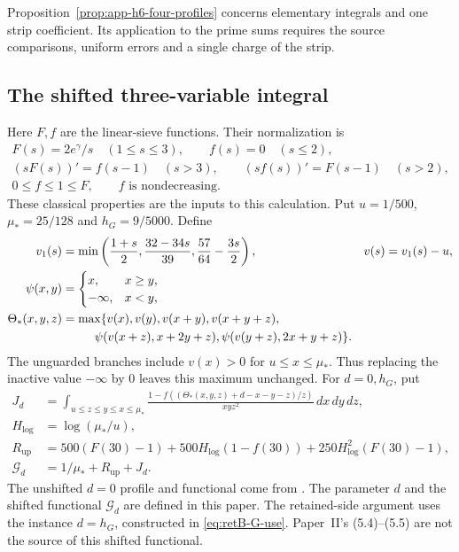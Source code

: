 Proposition~\ref{prop:app-h6-four-profiles} concerns elementary integrals and
one strip coefficient. Its application to the prime sums requires the
source comparisons, uniform errors and a single charge of the strip.


\subsection{The shifted three-variable integral}\label{subsec:app-m5}

Here \(F,f\) are the linear-sieve functions.
Their normalization is
\begin{equation}\label{eq:app-delay-functions}
\begin{gathered}
 F(s)=2e^\gamma/s\quad(1\le s\le3),\qquad f(s)=0\quad(s\le2),\\
 (sF(s))'=f(s-1)\quad(s>3),\qquad(sf(s))'=F(s-1)\quad(s>2),\\
 0\le f\le1\le F,\qquad f\text{ is nondecreasing}.
\end{gathered}
\end{equation}
These classical properties are the inputs to this calculation.
Put \(u=1/500\), \(\mu_*=25/128\) and \(h_G=9/5000\).
Define
\begin{equation}\label{eq:app-six-branch}
\begin{aligned}
 v_1(s)&=\min\left(\frac{1+s}{2},\frac{32-34s}{39},
                         \frac{57}{64}-\frac{3s}{2}\right),&
 v(s)&=v_1(s)-u,\\
 \psi(x,y)&=\begin{cases}x,&x\ge y,\\-\infty,&x<y,\end{cases}\\
 \Theta_*(x,y,z)&=\max\{v(x),v(y),v(x+y),v(x+y+z),\\
 &\hspace{2.7em}\psi(v(x+z),x+2y+z),
               \psi(v(y+z),2x+y+z)\}.
\end{aligned}
\end{equation}
The unguarded branches include \(v(x)>0\) for \(u\le x\le\mu_*\).
Thus replacing the inactive value \(-\infty\) by \(0\)
leaves this maximum unchanged.
For \(d=0,h_G\), put
\begin{equation}\label{eq:app-G-functional}
\begin{aligned}
 J_d&=\int_{u\le z\le y\le x\le\mu_*}
 \frac{1-f((\Theta_*(x,y,z)+d-x-y-z)/z)}{xyz^2}
 \,dx\,dy\,dz,\\
 H_{\log}&=\log(\mu_*/u),\\
 R_{\mathrm{up}}&=500(F(30)-1)+500H_{\log}(1-f(30))
                   +250H_{\log}^2(F(30)-1),\\
 \mathcal G_d&=1/\mu_*+R_{\mathrm{up}}+J_d.
\end{aligned}
\end{equation}
The unshifted $d=0$ profile and functional come from
\cite[(4.70)--(4.75)]{PaperII}. The parameter $d$ and the shifted functional
$\mathcal G_d$ are defined in this paper. The retained-side argument uses the
instance $d=h_G$, constructed in
\eqref{eq:retB-G-use}. Paper~II's (5.4)--(5.5) are not the source of this
shifted functional.

